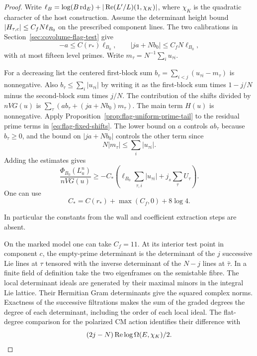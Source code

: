 \begin{proof}
Write \(\ell_B=\log(B\operatorname{rd}_E)
 +|\operatorname{Re} (L'/L)(1,\chi_K)|\), where \(\chi_K\) is the
quadratic character of the host construction. Assume the
determinant height bound \(\lvert H_{\tau,c}\rvert\le C_f N\ell_{B_0}\)
on the prescribed component lines. The two calibrations in
Section~\ref{sec:covolume-flag-test} give
\[
 -a\le C(r_*)\ell_{B_0},\qquad |ja+Nb_0|\le C_f N\ell_{B_0},
\] with at most fifteen
level primes. Write \(m_\tau=N^{-1}\sum_i u_{\tau i}\).

For a decreasing list the centered first-block sum
\(b_\tau=\sum_{i<j}(u_{\tau i}-m_\tau)\) is nonnegative.
Also \(b_\tau\le\sum_i|u_{\tau i}|\) by writing it as the
first-block sum times \(1-j/N\) minus the second-block sum
times \(j/N\). The contribution of the shifts divided by
\(nVG(u)\) is \(\sum_\tau(a b_\tau+(ja+Nb_0)m_\tau)\).
The main term \(H(u)\) is nonnegative. Apply
Proposition~\ref{prop:flag-uniform-prime-tail} to the residual
prime terms in \eqref{eq:flag-fixed-shifts}. The lower bound on
\(a\) controls \(a b_\tau\) because \(b_\tau\ge0\), and the bound on
\(|ja+Nb_0|\) controls the other term since
\[
 N|m_\tau|\le\sum_i |u_{\tau i}|.
\]
Adding the estimates gives
\begin{equation}\label{eq:flag-slope-lower}
 \frac{\Phi_{B_0}(L_u^n)}{nVG(u)}
 \ge-C_*\left(\ell_{B_0}\sum_{\tau,i}|u_{\tau i}|
                           +j_s\sum_\tau U_\tau\right).
\end{equation}
One can use
\[
 C_*=C(r_*)+\max(C_f,0)+8\log4.
\]

In particular the constants from the wall and coefficient
extraction steps are absent.

On the marked model one can take \(C_f=11\).
At its interior test point in component \(c\), the empty-prime
determinant is the determinant of the \(j\) successive Lie
lines at \(\tau\) tensored with the inverse determinant of the
\(N-j\) lines at \(\bar\tau\). In a finite field of definition
take the two eigenframes on the semistable fibre. The local
determinant ideals are generated by their maximal minors in the
integral Lie lattice. Their Hermitian Gram determinants give
the squared complex norms. Exactness of the successive
filtrations makes the sum of the graded degrees the degree of
each determinant, including the order of each local ideal.
The flat-degree comparison for the polarized CM action identifies
their difference with
\[
 (2j-N)\operatorname{Re}\log\Omega(E,\chi_K)/2.
\]


\end{proof}
